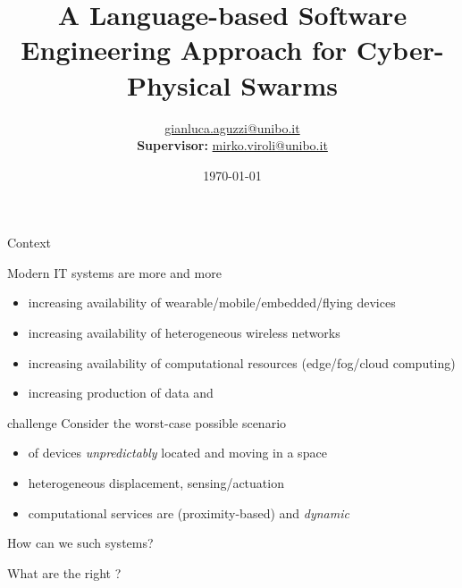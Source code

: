 \documentclass[presentation, 9pt,169]{beamer}\mode<presentation>{\usetheme{AMSBolognaFC}}
\title[A Soft-Eng Approach for CPSWs!]
{A Language-based Software Engineering Approach for Cyber-Physical Swarms}
\author[\sspeaker{G.Aguzzi}]
{\speaker{Gianluca Aguzzi} \href{mailto:gianluca.aguzzi@unibo.it}{gianluca.aguzzi@unibo.it} \\
\textbf{Supervisor:} \speaker{Mirko Viroli} \href{mailto:mirko.viroli@unibo.it}{mirko.viroli@unibo.it}}
\institute[DISI, Univ.\ Bologna]
{%
\textsc{Alma Mater Studiorum} -- Universit{\`a} di Bologna \\[0.1cm]
\textbf{PhD defense}\\[0.15cm]
}
\date[\today]{\today}
\begin{document}

\frame{\titlepage}

\section*{\refname}

\begin{frame}{Context}\label{context:start}
  \begin{exampleblock}{Modern IT systems are more and more }
    \begin{itemize}
      \item increasing availability of wearable/mobile/embedded/flying devices
      \item increasing availability of heterogeneous wireless networks
      \item increasing availability of computational resources (edge/fog/cloud computing)
      \item increasing production of data  and 
    \end{itemize}
  \end{exampleblock}
  \begin{alertblock}{ challenge}
    Consider the worst-case possible scenario
    \begin{itemize}
      \item {} of devices \emph{unpredictably} located and moving in a space
      \item heterogeneous displacement,  sensing/actuation
      \item computational services are  (proximity-based) and \emph{dynamic} 
    \end{itemize}
  \end{alertblock}
  \begin{center}
  \Large{How can we  such systems?}
  \end{center}
  \begin{center}
    \Large{What are the right ?}
    \end{center}
  \end{frame}
\end{document}
